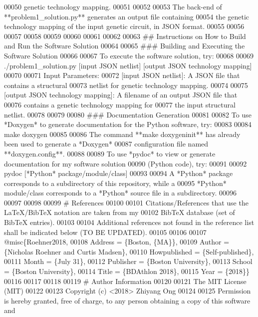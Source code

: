 \begin{DoxyCode}
00050    genetic technology mapping.
00051 
00052 
00053 The back-end of **problem1\_solution.py** generates an output file containing
00054    the genetic technology mapping of the input genetic circuit, in JSON format.
00055 
00056 
00057 
00058 
00059 
00060 
00061 
00062 
00063 ##  Instructions on How to Build and Run the Software Solution
00064 
00065 ###    Building and Executing the Software Solution
00066 
00067 To execute the software solution, try:
00068 
00069    ./problem1\_solution.py [input JSON netlist] [output JSON technology mapping]
00070 
00071 Input Parameters:
00072 [input JSON netlist]:                          A JSON file that contains a structural
00073                                                                        netlist for genetic technology
       mapping.
00074 
00075 [output JSON technology mapping]:  A filename of an output JSON file that
00076                                                                        contains a genetic technology
       mapping for
00077                                                                        the input structural netlist.
00078 
00079 
00080 ###    Documentation Generation
00081 
00082 To use *Doxygen* to generate documentation for the Python software, try:
00083 
00084    make doxygen
00085 
00086 The command **make doxygeninit** has already been used to generate a *Doxygen*
00087    configuration file named **doxygen.config**.
00088 
00089 To use *pydoc* to view or generate documentation for my software solution
00090    (Python code), try:
00091 
00092    pydoc [*Python* package/module/class]
00093 
00094 A *Python* package corresponds to a subdirectory of this repository, while a
00095    *Python* module/class corresponds to a *Python* source file in a subdirectory.
00096 
00097 
00098 
00099 #  References
00100 
00101 Citations/References that use the LaTeX/BibTeX notation are taken from my
00102    BibTeX database (set of BibTeX entries).
00103 
00104 Additional references not found in the reference list shall be indicated below (TO BE UPDATED).
00105 
00106 
00107 @misc\{Roehner2018,
00108    Address = \{Boston, \{MA\}\},
00109    Author = \{Nicholas Roehner and Curtis Madsen\},
00110    Howpublished = \{Self-published\},
00111    Month = \{July 31\},
00112    Publisher = \{Boston University\},
00113    School = \{Boston University\},
00114    Title = \{BDAthlon 2018\},
00115    Year = \{2018\}\}
00116 
00117 
00118 
00119 #  Author Information
00120 
00121 The MIT License (MIT)
00122 
00123 Copyright (c) <2018> Zhiyang Ong
00124 
00125 Permission is hereby granted, free of charge, to any person obtaining a copy of this software and

\end{DoxyCode}
